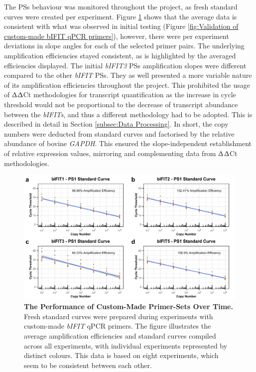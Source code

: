 The PSs behaviour was monitored throughout the project, as fresh standard curves were created per experiment. Figure \ref{fig:The Performance of Custom Made Primer Sets Over Time} shows that the average data is consistent with what was observed in initial testing (Figure \ref{fig:Validation of custom-made bIFIT qPCR primers}), however, there were per experiment deviations in slope angles for each of the selected primer pairs. The underlying amplification efficiencies stayed consistent, as is highlighted by the averaged efficiencies displayed. The initial \textit{bIFIT3} PSs amplification slopes were different compared to the other \textit{bIFIT} PSs. They as well presented a more variable nature of its amplification efficiencies throughout the project. This prohibited the usage of $\Updelta$$\Updelta$Ct methodologies for transcript quantification as the increase in cycle threshold would not be proportional to the decrease of transcript abundance between the \textit{bIFITs}, and thus a different methodology had to be adopted. This is described in detail in Section \ref{subsec:Data Processing}. In short, the copy numbers were deducted from standard curves and factorised by the relative abundance of bovine \textit{GAPDH}. This ensured the slope-independent establishment of relative expression values, mirroring and complementing data from $\Updelta$$\Updelta$Ct methodologies.

\begin{figure}
    \centering
    \includegraphics[width=1\linewidth]{07. Chapter 2/Figs/01. Technologies/03. standard curves behaviour.pdf}
    \caption[The Performance of Custom-Made Primer-Sets Over Time.]{\textbf{The Performance of Custom-Made Primer-Sets Over Time.} Fresh standard curves were prepared during experiments with custom-made \textit{bIFIT} qPCR primers. The figure illustrates the average amplification efficiencies and standard curves compiled across all experiments, with individual experiments represented by distinct colours. This data is based on eight experiments, which seem to be consistent between each other.}
    \label{fig:The Performance of Custom Made Primer Sets Over Time}
\end{figure}

